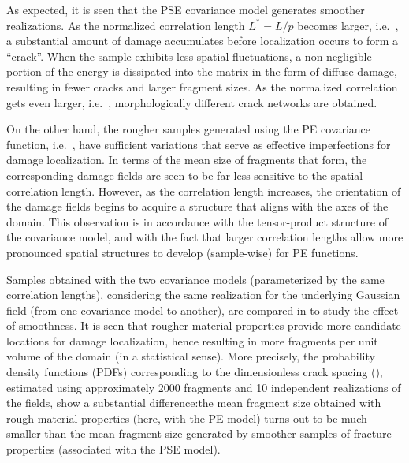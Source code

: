 As expected, it is seen that the PSE covariance model generates smoother realizations. As the normalized correlation length $L^* = L/p$ becomes larger, i.e.\ ,
a substantial amount of damage accumulates before localization occurs to form a ``crack''. When the sample exhibits less spatial fluctuations, a non-negligible portion of the energy is dissipated into the matrix in the form of diffuse damage, resulting in fewer cracks and larger fragment sizes. As the normalized correlation gets even larger, i.e.\ , morphologically different crack networks are obtained.

On the other hand, the rougher samples generated using the PE covariance function, i.e.\ , have sufficient variations that serve as effective imperfections for damage localization. In terms of the mean size of fragments that form, the corresponding damage fields are seen to be far less sensitive to the spatial correlation length.  However, as the correlation length increases, the orientation of the damage fields begins to acquire a structure that aligns with the axes of the domain. This observation is in accordance with the tensor-product structure of the covariance model, and with the fact that larger correlation lengths allow more pronounced spatial structures to develop (sample-wise) for PE functions.

Samples obtained with the two covariance models (parameterized by the same correlation lengths), considering the same realization for the underlying Gaussian field (from one covariance model to another), are compared in  to study the effect of smoothness. It is seen that rougher material properties provide more candidate locations for damage localization, hence resulting in more fragments per unit volume of the domain (in a statistical sense). More precisely, the probability density functions (PDFs) corresponding to the dimensionless crack spacing (), estimated using approximately 2000 fragments and 10 independent realizations of the fields, show a substantial difference:the mean fragment size obtained with rough material properties (here, with the PE model) turns out to be much smaller than the mean fragment size generated by smoother samples of fracture properties (associated with the PSE model).

